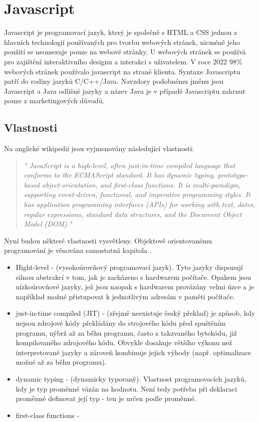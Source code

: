 \documentclass[main.tex]{subfiles}
\begin{document}
\section{Javascript}
Javascript je programovací jazyk, který je společně s HTML a CSS jednou z hlavních technologií používaných pro tvorbu webových stránek, nicméně jeho použití se neomezuje pouze na webové stránky. U webových stránek se používá pro zajištění interaktivního designu a interakci s uživatelem. V roce 2022 98\% webových stránek používalo javascript na straně klienta. Syntaxe Javascriptu patří do rodiny jazyků C/C++/Java. Navzdory podobnému jménu jsou Javascript a Java odlišné jazyky a název Java je v případě Javascriptu zahrnut pouze z marketingových důvodů.


\subsection{Vlastnosti}
Na anglické wikipedii jsou vyjmenovány následující vlastnosti:
\begin{quote} \textit{" JavaScript is a high-level, often just-in-time compiled language that conforms to the ECMAScript standard. It has dynamic typing, prototype-based object-orientation, and first-class functions. It is multi-paradigm, supporting event-driven, functional, and imperative programming styles. It has application programming interfaces (APIs) for working with text, dates, regular expressions, standard data structures, and the Document Object Model (DOM)." } \end{quote}

Nyní budou některé vlastnosti vysvětleny. Objektově orientovanému programování je věnována samostatná kapitola .
\begin{itemize}
    \item Hight-level - (vysokoúrovňový programovací jazyk). Tyto jazyky disponují silnou abstrakcí v tom, jak je zacházeno s hardwarem počítače. Opakem jsou nízkoúrovňové jazyky, jež jsou naopak s hardwarem provázány velmi úzce a je například možné přistupovat k jednotlivým adresám v paměti počítače.
    \item just-in-time compiled (JIT) - (zřejmě neexistuje český překlad) je způsob, kdy nejsou zdrojové kódy překládány do strojového kódu před spuštěním programu, nýbrž až za běhu programu, často z takzvaného bytekódu, již kompilovaného zdrojového kódu. Obvykle dosahuje většího výkonu než interpretované jazyky a zároveň kombinuje jejich výhody (např. optimalizace možné až za běhu programu).
    \item dynamic typing - (dynamicky typovaný). Vlastnost programovacích jazyků, kdy je typ proměnné vázán na hodnotu. Není tedy potřeba při deklaraci proměnné definovat její typ - ten je určen podle proměnné.
    \item first-class functions - 
\end{itemize}
\end{document}
